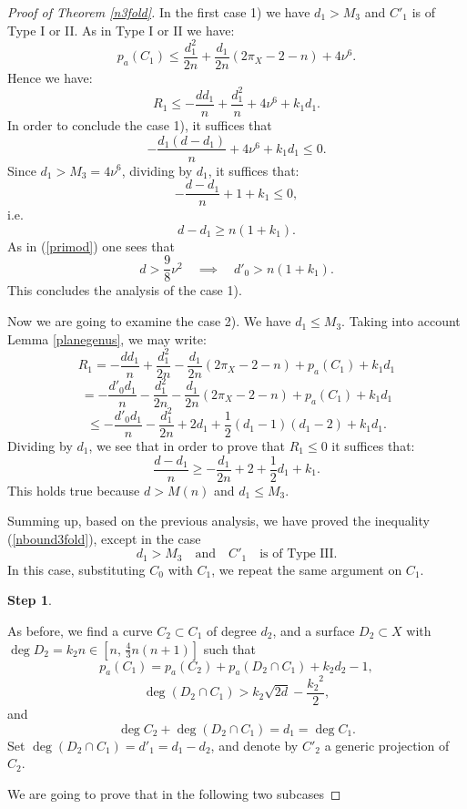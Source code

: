 \documentclass[9pt,a4paper]{amsart}
\theoremstyle{plain}
\theoremstyle{definition}
\theoremstyle{remark}
\begin{document}
\begin{proof}[Proof of Theorem \ref{n3fold}]
\smallskip
In the first case 1) we have $d_1>M_3$ and $C'_1$ is of  Type I or
II. As in Type I or II we have:
$$
p_a(C_1)\leq \frac{d_1^2}{2n}+\frac{d_1}{2n}(2\pi_X-2-n)+4\nu^6.
$$
Hence we have:
$$
R_1\leq -\frac{dd_1}{n}+\frac{d_1^2}{n}+4\nu^6+k_1d_1.
$$
In order to conclude the case 1), it suffices that
\begin{equation}\label{nstruttura}
-\frac{d_1(d-d_1)}{n}+4\nu^6+k_1d_1\leq 0.
\end{equation}
Since $d_1> M_3=4\nu^6$, dividing by $d_1$, it suffices that:
\begin{equation*}
-\frac{d-d_1}{n}+1+k_1\leq 0,
\end{equation*}
i.e.
$$
{d-d_1}\geq n({1}+k_1).
$$
As in (\ref{primod}) one sees that
$$
d>\frac{9}{8}\nu^2\quad \implies \quad d'_0>n({1}+k_1).
$$
This concludes the analysis of the case 1).

\smallskip
Now we are going to examine the case 2). We have $d_1\leq M_3$.
Taking into account Lemma \ref{planegenus}, we may write:
$$
R_1=-\frac{dd_1}{n}+\frac{d_1^2}{2n}-\frac{d_1}{2n}(2\pi_X-2-n)+p_a(C_1)+k_1d_1
$$
$$
=-\frac{d'_0d_1}{n}-\frac{d_1^2}{2n}-\frac{d_1}{2n}(2\pi_X-2-n)+p_a(C_1)+k_1d_1
$$
$$
\leq
-\frac{d'_0d_1}{n}-\frac{d_1^2}{2n}+2d_1+\frac{1}{2}(d_1-1)(d_1-2)+k_1d_1.
$$
Dividing by $d_1$, we see that in order to prove that $R_1\leq 0$ it
suffices that:
$$
\frac{d-d_1}{n}\geq -\frac{d_1}{2n}+2+\frac{1}{2}d_1+k_1.
$$
This holds true because $d>M(n)$ and $d_1\leq M_3$.

\smallskip
Summing up, based on the previous analysis, we have proved the
inequality (\ref{nbound3fold}), except in the case
$$
d_1>M_3\quad{\text{and}}\quad C'_1\quad{\text{is of Type III.}}
$$
In this case, substituting $C_0$ with $C_1$, we repeat the same
argument on $C_1$.

\smallskip
{\bf{Step 1}}.



\smallskip
As before, we find a curve $C_2\subset C_1$ of degree $d_2$, and a
surface $D_2\subset X$ with $\deg D_2=k_2n\in
[n,\,\frac{4}{3}n(n+1)]$ such that
\begin{equation}\label{stimaC_1}
p_a(C_1)=p_a(C_2)+p_a(D_2\cap C_1)+k_2d_2-1,
\end{equation}
$$
\deg (D_2\cap C_1) >  k_2\sqrt{2d}-\dfrac{{k_2}^2}{2},
$$
and
$$
\deg C_2+\deg(D_2\cap C_1)=d_1=\deg C_1.
$$
Set $\deg (D_2\cap C_1)=d'_1=d_1-d_2$, and denote by $C'_2$ a generic
projection of $C_2$.

\smallskip
We are going to prove that in the following two subcases


\end{proof}
\end{document}
